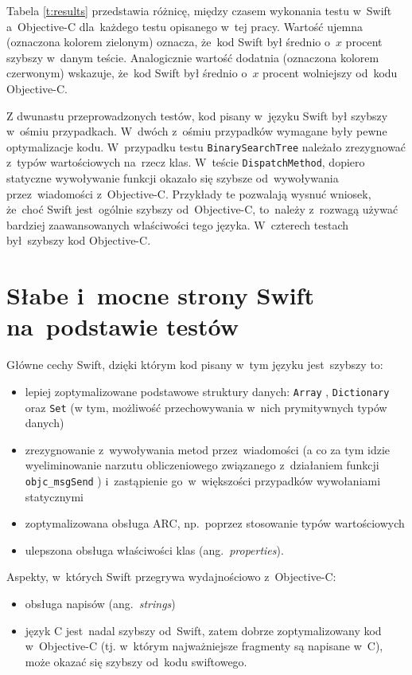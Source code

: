 \documentclass[mgr, shortabstract]{iithesis}
\newcommand{\ang}[1]{ang.~\textit{#1}}
\newcommand{\swiftinline}[1]{
    \texttt{#1}
}
\newcommand{\objcinline}[1]{
    \texttt{#1}
}
\begin{document}
Tabela \ref{t:results} przedstawia różnicę, między czasem wykonania testu w~Swift a~Objective-C dla~każdego testu opisanego w~tej pracy. Wartość ujemna (oznaczona kolorem zielonym) oznacza, że~kod Swift był średnio o~$x$ procent szybszy w~danym teście. Analogicznie wartość dodatnia (oznaczona kolorem czerwonym) wskazuje, że~kod Swift był średnio o~$x$ procent wolniejszy od~kodu Objective-C.

Z dwunastu przeprowadzonych testów, kod pisany w~języku Swift był szybszy w~ośmiu przypadkach. W~dwóch z~ośmiu przypadków wymagane były pewne optymalizacje kodu. W~przypadku testu \texttt{BinarySearchTree} należało zrezygnować z~typów wartościowych na~rzecz klas. W~teście \texttt{DispatchMethod}, dopiero statyczne wywoływanie funkcji okazało się szybsze od~wywoływania przez~wiadomości z~Objective-C. Przykłady te pozwalają wysnuć wniosek, że~choć Swift jest~ogólnie szybszy od~Objective-C, to~należy z~rozwagą używać bardziej zaawansowanych właściwości tego języka. W~czterech testach był szybszy kod Objective-C.

\section{Słabe i~mocne strony Swift na~podstawie testów}

Główne cechy Swift, dzięki którym kod pisany w~tym języku jest~szybszy to:
\begin{itemize}
    \item lepiej zoptymalizowane podstawowe struktury danych: \swiftinline{Array}, \swiftinline{Dictionary} oraz \swiftinline{Set} (w tym, możliwość przechowywania w~nich prymitywnych typów danych)
    \item zrezygnowanie z~wywoływania metod przez~wiadomości (a co za tym idzie wyeliminowanie narzutu obliczeniowego związanego z~działaniem funkcji \objcinline{objc_msgSend}) i~zastąpienie go~w~większości przypadków wywołaniami statycznymi
    \item zoptymalizowana obsługa ARC, np.~poprzez stosowanie typów wartościowych   
    \item ulepszona obsługa właściwości klas (\ang{properties}).
\end{itemize}

Aspekty, w~których Swift przegrywa wydajnościowo z~Objective-C:
\begin{itemize}
    \item obsługa napisów (\ang{strings})
    \item język C jest~nadal szybszy od~Swift, zatem dobrze zoptymalizowany kod w~Objective-C (tj. w~którym najważniejsze fragmenty są napisane w~C), może okazać się szybszy od~kodu swiftowego.
\end{itemize}
\end{document}

